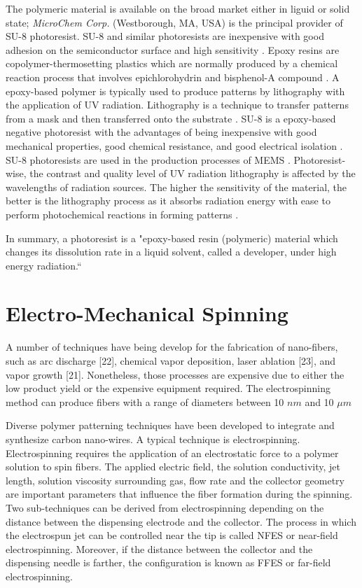 The polymeric material is available on the broad market either in liguid or solid state; \emph{MicroChem Corp.} (Westborough, MA, USA) is the principal provider of SU-8 photoresist. SU-8 and similar photoresists are inexpensive with good adhesion on the semiconductor surface and high sensitivity \cite{Staab2011}. Epoxy resins are copolymer-thermosetting plastics which are normally produced by a chemical reaction process that involves epichlorohydrin and bisphenol-A compound \cite{Singla2010}. A epoxy-based polymer is typically used to produce patterns by lithography with the application of UV radiation. Lithography is a technique to transfer patterns from a mask and then transferred onto the substrate \cite{Landis2011,Xu2014}. SU-8 is a epoxy-based negative photoresist with the advantages of being inexpensive with good mechanical properties, good chemical resistance, and good electrical isolation \cite{Xu2014}. SU-8 photoresists are used in the production processes of MEMS \cite{Zhang2001}. Photoresist-wise, the contrast and quality level of UV radiation lithography is affected by the wavelengths of radiation sources. The higher the sensitivity of the material, the better is the lithography process as it absorbs radiation energy with ease to perform photochemical reactions in forming patterns \cite{Zhang2001}.

In summary, a photoresist is a "epoxy-based resin (polymeric) material which changes its dissolution rate in a liquid solvent, called a developer, under high energy radiation.`` \cite{Landis2011}

\section{Electro-Mechanical Spinning}
A number of techniques have being develop for the fabrication of nano-fibers, such as arc discharge [22], chemical vapor deposition, laser ablation [23], and vapor growth [21]. Nonetheless, those processes are expensive due to either the low product yield or the expensive equipment required. The electrospinning method can produce fibers with a range of diameters between 10 $n m$ and 10 $\mu m$ 

Diverse polymer patterning techniques have been developed to integrate and synthesize carbon nano-wires. A typical technique is electrospinning. Electrospinning requires the application of an electrostatic force to a polymer solution to spin fibers. The applied electric field, the solution conductivity, jet length, solution viscosity surrounding gas, flow rate and the collector geometry are important parameters that influence the fiber formation during the spinning. \cite{Nataraj2012} Two sub-techniques can be derived from electrospinning depending on the distance between the dispensing electrode and the collector. The process in which the electrospun jet can be controlled near the
tip is called NFES or near-field electrospinning. \cite{Cisquella-Serra2019} Moreover, if the distance between the collector and the dispensing needle is farther, the configuration is known as FFES or far-field electrospinning. \cite{Nataraj2012}


